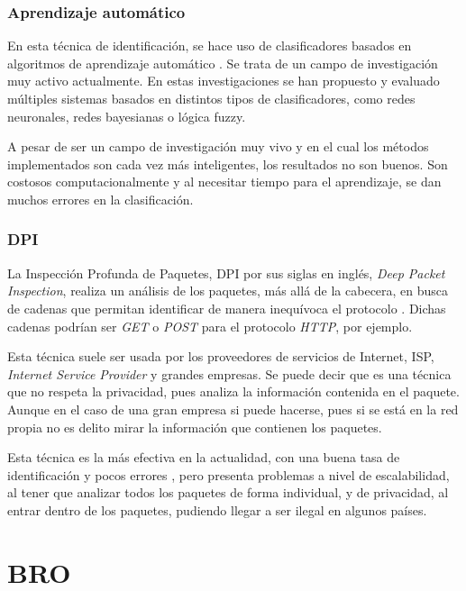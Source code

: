 \subsubsection{Aprendizaje automático}

En esta técnica de identificación, se hace uso de clasificadores basados en algoritmos de aprendizaje automático \cite{learning}. Se 
trata de un campo de investigación muy activo actualmente. En estas investigaciones se han propuesto y evaluado múltiples sistemas 
basados en distintos tipos de clasificadores, como redes neuronales, redes bayesianas o lógica fuzzy.

\intro A pesar de ser un campo de investigación muy vivo y en el cual los métodos implementados son cada vez más inteligentes, los 
resultados no son buenos. Son costosos computacionalmente y al necesitar tiempo para el aprendizaje, se dan muchos errores en la 
clasificación.

\subsubsection{DPI}

La Inspección Profunda de Paquetes, DPI por sus siglas en inglés, \textit{Deep Packet Inspection}, realiza un análisis de los 
paquetes, más allá de la cabecera, en busca de cadenas que permitan identificar de manera inequívoca el protocolo \cite{payload}. 
Dichas cadenas podrían ser \textit{GET} o \textit{POST} para el protocolo \textit{HTTP}, por ejemplo.

\intro Esta técnica suele ser usada por los proveedores de servicios de Internet, ISP, \textit{Internet Service Provider} y grandes 
empresas. Se puede decir que es una técnica que no respeta la privacidad, pues analiza la información contenida en el paquete. Aunque 
en el caso de una gran empresa si puede hacerse, pues si se está en la red propia no es delito mirar la información que contienen los 
paquetes.

\intro Esta técnica es la más efectiva en la actualidad, con una buena tasa de identificación y pocos errores \cite{dpiaproximacion}, 
pero presenta problemas a nivel de escalabilidad, al tener que analizar todos los paquetes de forma individual, y de privacidad, al 
entrar dentro de los paquetes, pudiendo llegar a ser ilegal en algunos países.

\section{BRO}

